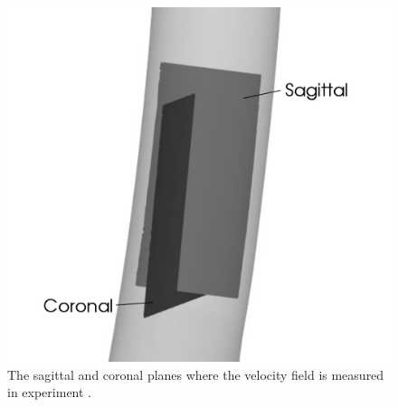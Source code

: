\begin{figure}[htbp]
\begin{minipage}[c][8cm][c]{0.15\textwidth}
    \end{minipage}
    \begin{minipage}[c][8cm][c]{0.2\textwidth} 
    \includegraphics[scale=0.25]{imgs/vena_cava/venacava_piv3.pdf}
    \end{minipage} 
    \caption{The sagittal and coronal planes where the velocity field is measured in experiment \cite{gallagher_exp}.}
    \label{fig:IVCPIV}
\end{figure}

